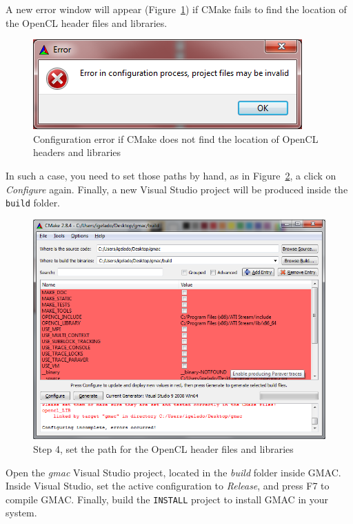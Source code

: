 A new error window will appear (Figure~\ref{fig:install:cmake-opencl-error}) if CMake fails to find 
the location of the OpenCL header files and libraries.
\begin{figure}[h]
\centering
\includegraphics[width=0.5\linewidth]{installation/figures/cmake-opencl-error}
\caption{Configuration error if CMake does not find the location of OpenCL headers and libraries}
\label{fig:install:cmake-opencl-error}
\end{figure}


In such a case, you need to set those paths by hand, as in 
Figure~\ref{fig:install:cmake-opencl-path}, a click on \emph{Configure} again. Finally, a new Visual 
Studio project will be produced inside the \texttt{build} folder.
\begin{figure}[h]
\centering
\includegraphics[width=0.8\linewidth]{installation/figures/cmake-opencl-path}
\caption{Step 4, set the path for the OpenCL header files and libraries}
\label{fig:install:cmake-opencl-path}
\end{figure}

Open the \emph{gmac} Visual Studio project, located in the \emph{build} folder inside GMAC\@. Inside 
Visual Studio, set the active configuration to \emph{Release}, and press F7 to compile GMAC\@.  
Finally, build the \texttt{INSTALL} project to install GMAC in your system.


